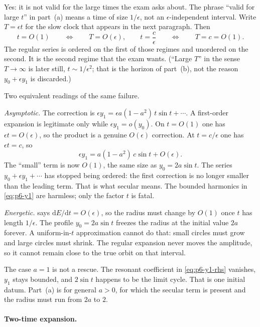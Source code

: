 \begin{remark}
\label{rem:p6-regular-fails}
Yes: it is not valid for the large times the exam asks about. The phrase ``valid for large \(t\)'' in part~(a) means a time of size \(1/\epsilon\), not an \(\epsilon\)-independent interval. Write \(T=\epsilon t\) for the slow clock that appears in the next paragraph. Then
\[
t=O(1)
\qquad\Longleftrightarrow\qquad
T=O(\epsilon),
\qquad
t=\frac{c}{\epsilon}
\qquad\Longleftrightarrow\qquad
T=c=O(1).
\]
The regular series is ordered on the first of those regimes and unordered on the second. It is the second regime that the exam wants. (``Large \(T\)'' in the sense \(T\to\infty\) is later still, \(t\sim 1/\epsilon^2\); that is the horizon of part~(b), not the reason \(y_0+\epsilon y_1\) is discarded.)

Two equivalent readings of the same failure.

\emph{Asymptotic.} The correction is \(\epsilon y_1=\epsilon a(1-a^2)\,t\sin t+\cdots\). A first-order expansion is legitimate only while \(\epsilon y_1=o(y_0)\). On \(t=O(1)\) one has \(\epsilon t=O(\epsilon)\), so the product is a genuine \(O(\epsilon)\) correction. At \(t=c/\epsilon\) one has \(\epsilon t=c\), so
\[
\epsilon y_1
=
a(1-a^2)\,c\sin t+O(\epsilon).
\]
The ``small'' term is now \(O(1)\), the same size as \(y_0=2a\sin t\). The series \(y_0+\epsilon y_1+\cdots\) has stopped being ordered: the first correction is no longer smaller than the leading term. That is what secular means. The bounded harmonics in \eqref{eq:p6-y1} are harmless; only the factor \(t\) is fatal.

\emph{Energetic.}  says \(\mathrm{d}E/\mathrm{d}t=O(\epsilon)\), so the radius must change by \(O(1)\) once \(t\) has length \(1/\epsilon\). The profile \(y_0=2a\sin t\) freezes the radius at the initial value \(2a\) forever. A uniform-in-\(t\) approximation cannot do that: small circles must grow and large circles must shrink. The regular expansion never moves the amplitude, so it cannot remain close to the true orbit on that interval.

The case \(a=1\) is not a rescue. The resonant coefficient in \eqref{eq:p6-y1-rhs} vanishes, \(y_1\) stays bounded, and \(2\sin t\) happens to be the limit cycle. That is one initial datum. Part~(a) is for general \(a>0\), for which the secular term is present and the radius must run from \(2a\) to \(2\).
\end{remark}

\paragraph{Two-time expansion.}

